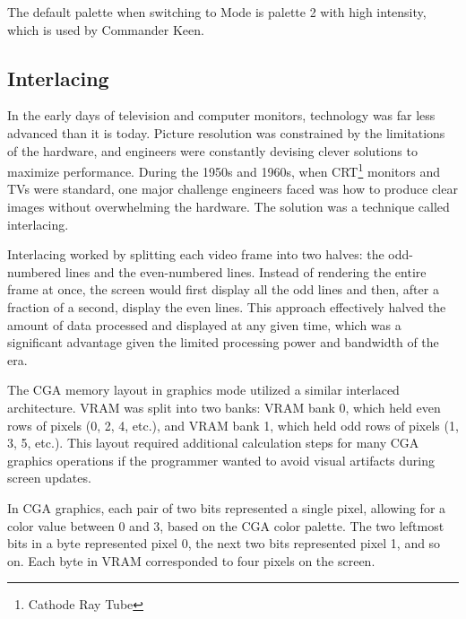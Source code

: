 \documentclass[book.tex]{subfiles}
\begin{document}
The default palette when switching to Mode  is palette 2 with high intensity, which is used by Commander Keen.  \\

\par
\begin{minipage}{\textwidth}
  
\end{minipage}










\subsection{Interlacing}
In the early days of television and computer monitors, technology was far less advanced than it is today. Picture resolution was constrained by the limitations of the hardware, and engineers were constantly devising clever solutions to maximize performance. During the 1950s and 1960s, when CRT\footnote{Cathode Ray Tube} monitors and TVs were standard, one major challenge engineers faced was how to produce clear images without overwhelming the hardware. The solution was a technique called interlacing.\\

\par
Interlacing worked by splitting each video frame into two halves: the odd-numbered lines and the even-numbered lines. Instead of rendering the entire frame at once, the screen would first display all the odd lines and then, after a fraction of a second, display the even lines. This approach effectively halved the amount of data processed and displayed at any given time, which was a significant advantage given the limited processing power and bandwidth of the era.\\

\par
The CGA memory layout in graphics mode utilized a similar interlaced architecture. VRAM was split into two banks: VRAM bank 0, which held even rows of pixels (0, 2, 4, etc.), and VRAM bank 1, which held odd rows of pixels (1, 3, 5, etc.). This layout required additional calculation steps for many CGA graphics operations if the programmer wanted to avoid visual artifacts during screen updates.\\

\par
In CGA graphics, each pair of two bits represented a single pixel, allowing for a color value between 0 and 3, based on the CGA color palette. The two leftmost bits in a byte represented pixel 0, the next two bits represented pixel 1, and so on. Each byte in VRAM corresponded to four pixels on the screen.\\
\end{document}
